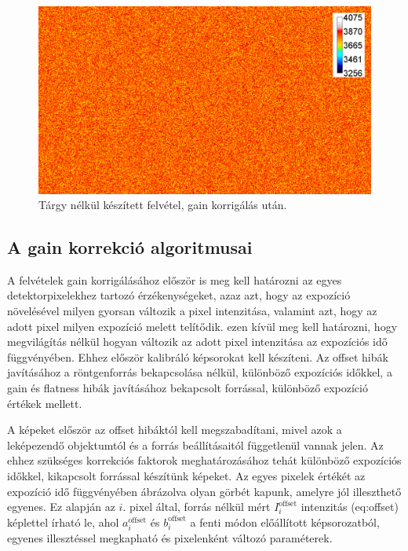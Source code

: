 \documentclass[a4paper,12pt,twoside]{article}
\begin{document}
\begin{figure}[htbp]
\center
\includegraphics[width=1.0\textwidth]{abrak/gainnel}
\caption{Tárgy nélkül készített felvétel, gain korrigálás után.}
\label{fig:gainnel}
\end{figure}

\subsection{A gain korrekció algoritmusai}

A felvételek gain korrigálásához először is meg kell határozni az egyes detektorpixelekhez tartozó érzékenységeket, azaz azt, hogy az expozíció növelésével milyen gyorsan változik a pixel intenzitása, valamint azt, hogy az adott pixel milyen expozíció melett telítődik. ezen kívül meg kell határozni, hogy megvilágítás nélkül hogyan változik az adott pixel intenzitása az expozíciós idő függvényében. Ehhez először kalibráló képsorokat kell készíteni. Az offset hibák javításához a röntgenforrás bekapcsolása nélkül, különböző expozíciós időkkel, a gain és flatness hibák javításához bekapcsolt forrással, különböző expozíció értékek mellett. 

A képeket először az offset hibáktól kell megszabadítani, mivel azok a leképezendő objektumtól és a forrás beállításaitól függetlenül vannak jelen. Az ehhez szükséges korrekciós faktorok meghatározásához tehát különböző expozíciós időkkel, kikapcsolt forrással készítünk képeket. Az egyes pixelek értékét az expozíció idő függvényében ábrázolva olyan görbét kapunk, amelyre jól illeszthető egyenes. Ez alapján az $i$. pixel által, forrás nélkül mért $ I_i^{\text{offset}}$ intenzitás \aref({eq:offset}) képlettel írható le, ahol $a_i^{\text{offset}} $ és $b_i^{\text{offset}}$ a fenti módon előállított képsorozatból, egyenes illesztéssel megkapható és pixelenként változó paraméterek.
\end{document}
